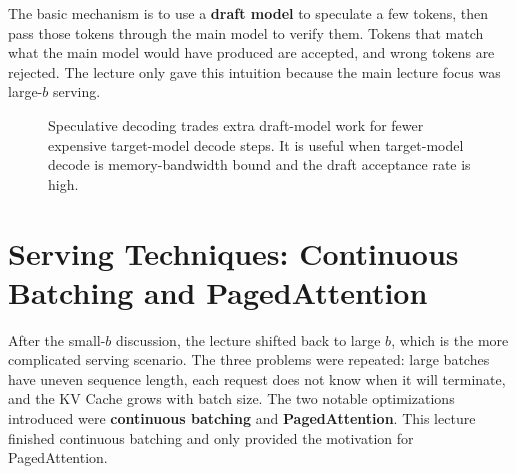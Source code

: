 \documentclass[twoside]{article}
\begin{document}
The basic mechanism is to use a \textbf{draft model} to speculate a few tokens, then pass those tokens through the main model to verify them.  Tokens that match what the main model would have produced are accepted, and wrong tokens are rejected.  The lecture only gave this intuition because the main lecture focus was large-\(b\) serving.

\begin{figure}[H]
\centering
{}
\caption{Speculative decoding trades extra draft-model work for fewer expensive target-model decode steps.  It is useful when target-model decode is memory-bandwidth bound and the draft acceptance rate is high.}
\label{fig:speculative}
\end{figure}

\section{Serving Techniques: Continuous Batching and PagedAttention}

After the small-\(b\) discussion, the lecture shifted back to large \(b\), which is the more complicated serving scenario.  The three problems were repeated: large batches have uneven sequence length, each request does not know when it will terminate, and the KV Cache grows with batch size.  The two notable optimizations introduced were \textbf{continuous batching} and \textbf{PagedAttention}.  This lecture finished continuous batching and only provided the motivation for PagedAttention.
\end{document}
